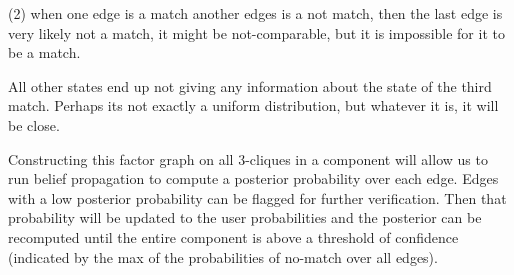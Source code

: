 (2) when one edge is a match another edges is a not match, then the last edge
is very likely not a match, it might be not-comparable, but it is impossible
for it to be a match.

All other states end up not giving any information about the state of the third
match.  Perhaps its not exactly a uniform distribution, but whatever it is, it
will be close.


Constructing this factor graph on all 3-cliques in a component will allow us to
run belief propagation to compute a posterior probability over each edge.
Edges with a low posterior probability can be flagged for further verification. 
Then that probability will be updated to the user probabilities and the
posterior can be recomputed until the entire component is above a threshold of
confidence (indicated by the max of the probabilities of no-match over all
  edges).

